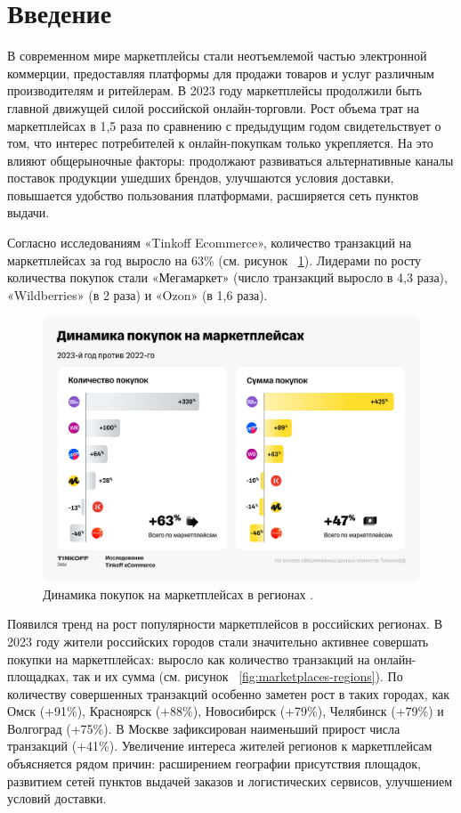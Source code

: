 \documentclass[a4paper,12pt]{extarticle}
\begin{document}
\newpage
\section*{Введение}   %
В современном мире маркетплейсы стали неотъемлемой частью электронной коммерции, предоставляя платформы для продажи товаров и услуг различным производителям и ритейлерам.
В 2023 году маркетплейсы продолжили быть главной движущей силой российской онлайн-торговли. Рост объема трат на маркетплейсах в 1,5 раза по сравнению с предыдущим годом свидетельствует о том, что интерес потребителей к онлайн-покупкам только укрепляется. На это влияют общерыночные факторы: продолжают развиваться альтернативные каналы поставок продукции ушедших брендов, улучшаются условия доставки, повышается удобство пользования платформами, расширяется сеть пунктов выдачи.

Согласно исследованиям «Tinkoff Ecommerce»\cite{tinkoff-research}, количество транзакций на маркетплейсах за год выросло на 63\% (см. рисунок ~\ref{fig:marketplaces-purchases-increased}). Лидерами по росту количества покупок стали «Мегамаркет» (число транзакций выросло в 4,3 раза), «Wildberries» (в 2 раза) и «Ozon» (в 1,6 раза).

\begin{figure}[hbtp]
	\centering
	\includegraphics[scale=0.3]{marketplaces-purchases-increased.png}
	\caption{Динамика покупок на маркетплейсах в регионах \cite{tinkoff-research}.}
	\label{fig:marketplaces-purchases-increased}
\end{figure} 

Появился тренд на рост популярности маркетплейсов в российских регионах. В 2023 году жители российских городов стали значительно активнее совершать покупки на маркетплейсах: выросло как количество транзакций на онлайн-площадках, так и их сумма (см. рисунок ~\ref{fig:marketplaces-regions}). По количеству совершенных транзакций особенно заметен рост в таких городах, как Омск (+91\%), Красноярск (+88\%), Новосибирск (+79\%), Челябинск (+79\%) и Волгоград (+75\%). В Москве зафиксирован наименьший прирост числа транзакций (+41\%). Увеличение интереса жителей регионов к маркетплейсам объясняется рядом причин: расширением географии присутствия площадок, развитием сетей пунктов выдачей заказов и логистических сервисов, улучшением условий доставки.
\end{document}
